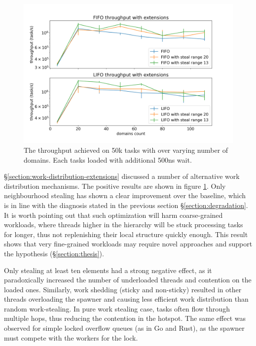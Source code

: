 \documentclass[12pt,a4paper,twoside]{report}
\begin{document}
\begin{figure} 
     \centering
     \includegraphics[width=1\textwidth]{eval/packet-basic-distribution10-granular-bigger_font.png}
     \caption{The throughput achieved on 50k tasks with over varying number of domains. Each tasks loaded with additional 500ns wait.}
    \label{fig:packet-extenstions}
\end{figure}


\S\ref{section:work-distribution-extensions} discussed a number of alternative work distribution mechanisms. The positive results are shown in figure \ref{fig:packet-extenstions}. Only neighbourhood stealing has shown a clear improvement over the baseline, which is in line with the diagnosis stated in the previous section \S\ref{section:degradation}. It is worth pointing out that such optimization will harm coarse-grained workloads, where threads higher in the hierarchy will be stuck processing tasks for longer, thus not replenishing their local structure quickly enough. This result shows that very fine-grained workloads may require novel approaches and support the hypothesis (\S\ref{section:thesis}).

\label{paragraph:overflow-queue-bad-1}
Only stealing at least ten elements had a strong negative effect, as it paradoxically increased the number of underloaded threads and contention on the loaded ones. Similarly, work shedding (sticky and non-sticky) resulted in other threads overloading the spawner and causing less efficient work distribution than random work-stealing. In pure work stealing case, tasks often flow through multiple hops, thus reducing the contention in the hotspot. The same effect was observed for simple locked overflow queues (as in Go and Rust), as the spawner must compete with the workers for the lock.
\end{document}
